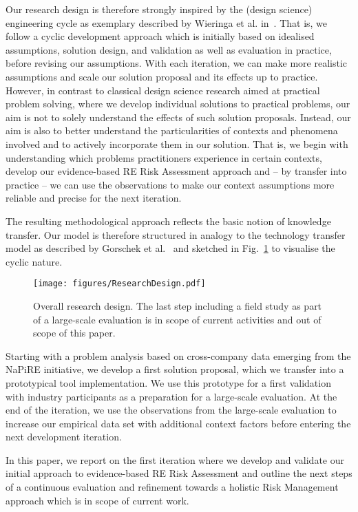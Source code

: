\documentclass[lnbip]{svmultln}
\begin{document}
Our research design is therefore strongly inspired by the (design science) engineering cycle as exemplary described by Wieringa et al. in~\cite{MA12}. That is, we follow a cyclic development approach which is initially based on idealised assumptions, solution design, and validation as well as evaluation in practice, before revising our assumptions. With each iteration, we can make more realistic assumptions and scale our solution proposal and its effects up to practice. However, in contrast to classical design science research aimed at practical problem solving, where we develop individual solutions to practical problems, our aim is not to solely understand the effects of such solution proposals. Instead, our aim is also to better understand the particularities of contexts and phenomena involved and to actively incorporate them in our solution. That is, we begin with understanding which problems practitioners experience in certain contexts, develop our evidence-based RE Risk Assessment approach and -- by transfer into practice -- we can use the observations to make our context assumptions more reliable and precise for the next iteration. 

The resulting methodological approach reflects the basic notion of knowledge transfer. Our model is therefore structured in analogy to the technology transfer model as described by Gorschek et al.~\cite{GGLW06} and sketched in Fig.~\ref{fig:ResearchDesign} to visualise the cyclic nature. 

\begin{figure}[!hbtp]
\centering
  \texttt{[image: figures/ResearchDesign.pdf]}\\
  \caption{Overall research design. The last step including a field study as part of a large-scale evaluation is in scope of current activities and out of scope of this paper.}
  \label{fig:ResearchDesign}
\end{figure} 

Starting with a problem analysis based on cross-company data emerging from the NaPiRE initiative, we develop a first solution proposal, which we transfer into a prototypical tool implementation. We use this prototype for a first validation with industry participants as a preparation for a large-scale evaluation. At the end of the iteration, we use the observations from the large-scale evaluation to increase our empirical data set with additional context factors before entering the next development iteration. 

In this paper, we report on the first iteration where we develop and validate our initial approach to evidence-based RE Risk Assessment and outline the next steps of a continuous evaluation and refinement towards a holistic Risk Management approach which is in scope of current work. 
\end{document}
